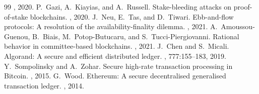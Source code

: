 \documentclass[11pt,a4paper]{article}
\theoremstyle{definition}
\begin{document}
\begin{thebibliography}{99}
, 2020.
P.~Gazi, A.~Kiayias, and A.~Russell.
\newblock Stake-bleeding attacks on proof-of-stake blockchains.
, 2020.
J.~Neu, E.~Tas, and D.~Tiwari.
\newblock Ebb-and-flow protocols: A resolution of the availability-finality dilemma.
, 2021.
A.~Amoussou-Guenou, B.~Biais, M.~Potop-Butucaru, and S.~Tucci-Piergiovanni.
\newblock Rational behavior in committee-based blockchains.
, 2021.
J.~Chen and S.~Micali.
\newblock Algorand: A secure and efficient distributed ledger.
, 777:155--183, 2019.
Y.~Sompolinsky and A.~Zohar.
\newblock Secure high-rate transaction processing in Bitcoin.
, 2015.
G.~Wood.
\newblock Ethereum: A secure decentralised generalised transaction ledger.
, 2014.
\end{thebibliography}
\end{document}
